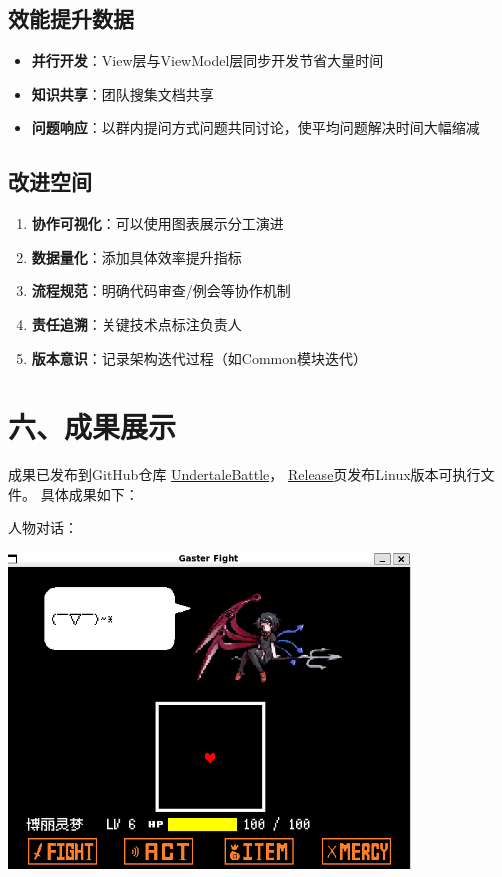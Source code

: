 \documentclass{article}
\begin{document}
\subsection{效能提升数据}
\begin{itemize}
    \item \textbf{并行开发}：View层与ViewModel层同步开发节省大量时间
    \item \textbf{知识共享}：团队搜集文档共享
    \item \textbf{问题响应}：以群内提问方式问题共同讨论，使平均问题解决时间大幅缩减
\end{itemize}

\subsection{改进空间}
\begin{enumerate}
    \item \textbf{协作可视化}：可以使用图表展示分工演进
    \item \textbf{数据量化}：添加具体效率提升指标
    \item \textbf{流程规范}：明确代码审查/例会等协作机制
    \item \textbf{责任追溯}：关键技术点标注负责人
    \item \textbf{版本意识}：记录架构迭代过程（如Common模块迭代）
\end{enumerate}

\section{六、成果展示}

成果已发布到GitHub仓库 \href{https://github.com/SHenpengYU01/UndertaleBattle}{UndertaleBattle}，
\href{https://github.com/SHenpengYU01/UndertaleBattle/releases/tag/game}{Release}页发布Linux版本可执行文件。
具体成果如下：

人物对话：

\includegraphics[width=0.8\textwidth]{figure/result1.png}\\
\end{document}
